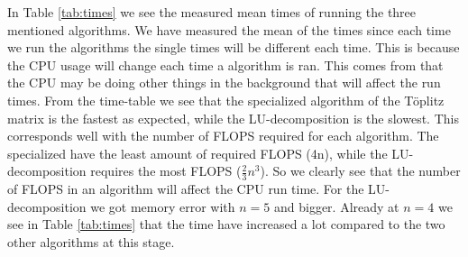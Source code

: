 \documentclass[12pt,a4paper,english]{article}
\begin{document}
In Table \ref{tab:times} we see the measured mean times of running the three mentioned algorithms. We have measured the mean of the times since each time we run the algorithms the single times will be different each time. This is because the CPU usage will change each time a algorithm is ran. This comes from that the CPU may be doing other things in the background that will affect the run times. From the time-table we see that the specialized algorithm of the Töplitz matrix is the fastest as expected, while the LU-decomposition is the slowest. This corresponds well with the number of FLOPS required for each algorithm. The specialized have the least amount of required FLOPS (4n), while the LU-decomposition requires the most FLOPS ($\frac{2}{3}n^3$). So we clearly see that the number of FLOPS in an algorithm will affect the CPU run time. For the LU-decomposition we got memory error with $n=5$ and bigger. Already at $n=4$ we see in Table \ref{tab:times} that the time have increased a lot compared to the two other algorithms at this stage.
\end{document}
